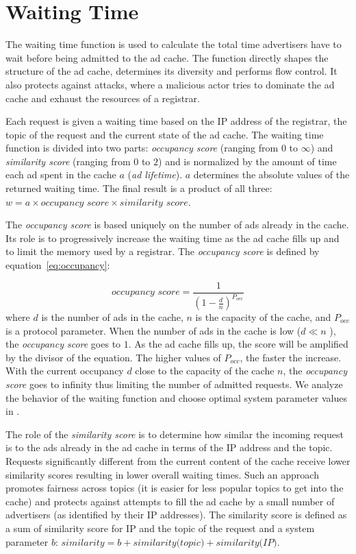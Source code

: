 \section{Waiting Time}
\label{sec:waitingTime}

The waiting time function is used to calculate the total time advertisers have to wait before being admitted to the ad cache. 
The function directly shapes the structure of the ad cache, determines its diversity and performs flow control. 
It also protects against attacks, where a malicious actor tries to dominate the ad cache and exhaust the resources of a registrar. 

Each request is given a waiting time based on the IP address of the registrar, the topic of the request and the current state of the ad cache. 
The waiting time function is divided into two parts: \emph{occupancy score} (ranging from $0$ to $\infty$) and  \emph{similarity score} (ranging from $0$ to $2$) and is normalized by the amount of time each ad spent in the cache $a$ (\ie \emph{ad lifetime}). $a$ determines the absolute values of the returned waiting time. The final result is a product of all three: $w = a \times \textit{occupancy score} \times \textit{similarity score}.$

The \emph{occupancy score} is based uniquely on the number of ads already in the cache.
Its role is to progressively increase the waiting time as the ad cache fills up and to limit the memory used by a registrar.
The \emph{occupancy score} is defined by equation~\ref{eq:occupancy}:

\begin{equation}
\label{eq:occupancy}
    \textit{occupancy score} = \frac{1}{(1-\frac{d}{n})^{P_{occ}}}
\end{equation}
where $d$ is the number of ads in the cache, $n$ is the capacity of the cache, and $P_\textit{occ}$ is a protocol parameter. 
When the number of ads in the cache is low ($d \ll n$ ), the \emph{occupancy score} goes to $1$. 
As the ad cache fills up, the score will be amplified by the divisor of the equation. 
The higher values of $P_\textit{occ}$, the faster the increase. 
With the current occupancy $d$ close to the capacity of the cache $n$, the \emph{occupancy score} goes to infinity thus limiting the number of admitted requests. We analyze the behavior of the waiting function and choose optimal system parameter values in .

The role of the \emph{similarity score} is to determine how similar the incoming request is to the ads already in the ad cache in terms of the IP address and the topic. 
Requests significantly different from the current content of the cache receive lower similarity scores resulting in lower overall waiting times. 
Such an approach promotes fairness across topics (it is easier for less popular topics to get into the cache) and protects against attempts to fill the ad cache by a small number of advertisers (as identified by their IP addresses). The similarity score is defined as a sum of similarity score for IP and the topic of the request and a system parameter $b$: $\textit{similarity} = b + \textit{similarity(topic)} + \textit{similarity(IP)}$. 

